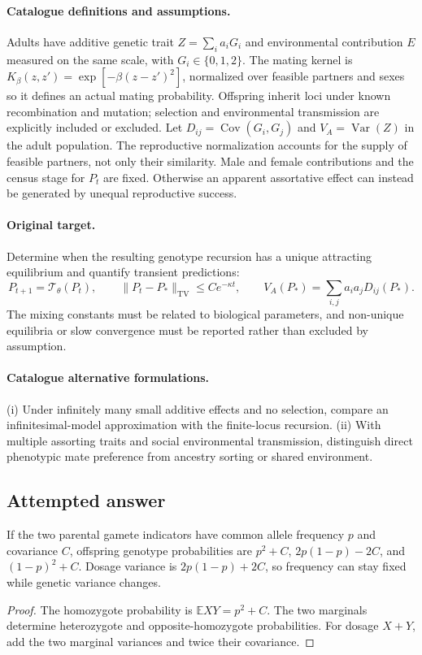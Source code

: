\documentclass[11pt]{article}
\begin{document}
\paragraph{Catalogue definitions and assumptions.}
Adults have additive genetic trait $Z=\sum_i a_iG_i$ and environmental contribution $E$ measured on the same scale, with $G_i\in\{0,1,2\}$. The mating kernel is $K_\beta(z,z')=\exp[-\beta(z-z')^2]$, normalized over feasible partners and sexes so it defines an actual mating probability. Offspring inherit loci under known recombination and mutation; selection and environmental transmission are explicitly included or excluded. Let $D_{ij}=\operatorname{Cov}(G_i,G_j)$ and $V_A=\operatorname{Var}(Z)$ in the adult population. The reproductive normalization accounts for the supply of feasible partners, not only their similarity. Male and female contributions and the census stage for $P_t$ are fixed. Otherwise an apparent assortative effect can instead be generated by unequal reproductive success.
\paragraph{Original target.}
Determine when the resulting genotype recursion has a unique attracting equilibrium and quantify transient predictions:
\[
 P_{t+1}=\mathcal T_\theta(P_t),\qquad
 \|P_t-P_*\|_{\mathrm{TV}}\le C e^{-\kappa t},\qquad
 V_A(P_*)=\sum_{i,j}a_i a_jD_{ij}(P_*).
\]
The mixing constants must be related to biological parameters, and non-unique equilibria or slow convergence must be reported rather than excluded by assumption.
\paragraph{Catalogue alternative formulations.}
(i) Under infinitely many small additive effects and no selection, compare an infinitesimal-model approximation with the finite-locus recursion. (ii) With multiple assorting traits and social environmental transmission, distinguish direct phenotypic mate preference from ancestry sorting or shared environment.
\subsection{Attempted answer}
\begin{proposition}
If the two parental gamete indicators have common allele frequency $p$ and covariance $C$, offspring genotype probabilities are $p^2+C$, $2p(1-p)-2C$, and $(1-p)^2+C$. Dosage variance is $2p(1-p)+2C$, so frequency can stay fixed while genetic variance changes.
\end{proposition}
\begin{proof}
The homozygote probability is $\mathbb{E} XY=p^2+C$. The two marginals determine heterozygote and opposite-homozygote probabilities. For dosage $X+Y$, add the two marginal variances and twice their covariance.
\end{proof}
\end{document}
